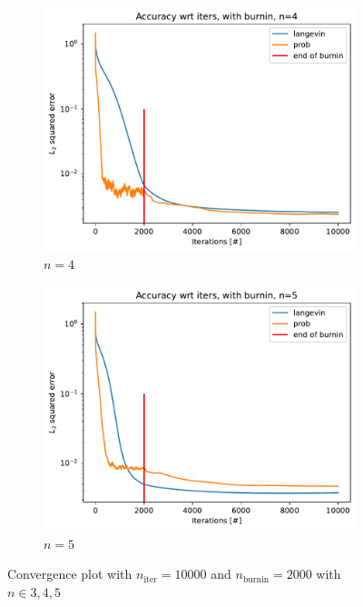 \documentclass[12pt]{memoir}
\newcommand{\nitern}[1]{$n_{\text{iter}}=#1$}
\newcommand{\nburninn}[1]{$n_{\text{burnin}}=#1$}
\begin{document}
\begin{figure}[H]
\begin{subfigure}[b]{0.49\textwidth}
        \includegraphics[width=\textwidth]{figures/experiments/baseline/diff_n_qubits/iters_acc_comp_iters_no_avg_n4-1.png}

        \caption{$n=4$}

        \label{fig:conv-plot-diff-n-4-sub}

    \end{subfigure}

    \begin{subfigure}[b]{0.49\textwidth}


        \centering

        \includegraphics[width=\textwidth]{figures/experiments/baseline/diff_n_qubits/iters_acc_comp_iters_no_avg_n5-1.png}

        \caption{$n=5$}

        \label{fig:conv-plot-diff-n-5-sub}

    \end{subfigure}

    \caption{Convergence plot with \nitern{10000} and \nburninn{2000} with $n\in{3,4,5}$}

    \label{fig:conv-plot-diff-n}

\end{figure}
\end{document}
